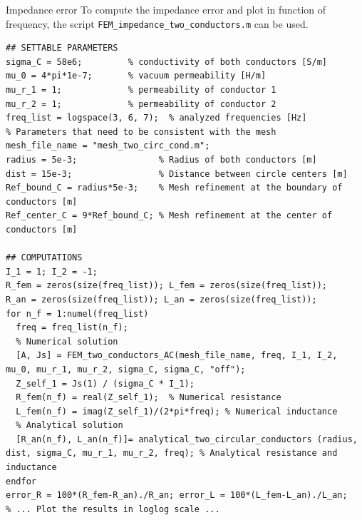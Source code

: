 \documentclass[aspectratio=54,xcolor=dvipsnames]{beamer}
\begin{document}
\begin{frame}[fragile]{Impedance error}
\scriptsize
To compute the impedance error and plot in function of frequency, the script \texttt{FEM\_impedance\_two\_conductors.m} can be used. 
\begin{lstlisting}[firstnumber=1]
## SETTABLE PARAMETERS
sigma_C = 58e6;         % conductivity of both conductors [S/m]
mu_0 = 4*pi*1e-7;       % vacuum permeability [H/m]
mu_r_1 = 1;             % permeability of conductor 1
mu_r_2 = 1;             % permeability of conductor 2
freq_list = logspace(3, 6, 7);  % analyzed frequencies [Hz]
% Parameters that need to be consistent with the mesh 
mesh_file_name = "mesh_two_circ_cond.m";
radius = 5e-3;                % Radius of both conductors [m]
dist = 15e-3;                 % Distance between circle centers [m]
Ref_bound_C = radius*5e-3;    % Mesh refinement at the boundary of conductors [m]
Ref_center_C = 9*Ref_bound_C; % Mesh refinement at the center of conductors [m]

## COMPUTATIONS
I_1 = 1; I_2 = -1;
R_fem = zeros(size(freq_list)); L_fem = zeros(size(freq_list));
R_an = zeros(size(freq_list)); L_an = zeros(size(freq_list));
for n_f = 1:numel(freq_list)
  freq = freq_list(n_f);
  % Numerical solution
  [A, Js] = FEM_two_conductors_AC(mesh_file_name, freq, I_1, I_2, mu_0, mu_r_1, mu_r_2, sigma_C, sigma_C, "off");
  Z_self_1 = Js(1) / (sigma_C * I_1);
  R_fem(n_f) = real(Z_self_1);  % Numerical resistance
  L_fem(n_f) = imag(Z_self_1)/(2*pi*freq); % Numerical inductance
  % Analytical solution
  [R_an(n_f), L_an(n_f)]= analytical_two_circular_conductors (radius, dist, sigma_C, mu_r_1, mu_r_2, freq); % Analytical resistance and inductance
endfor
error_R = 100*(R_fem-R_an)./R_an; error_L = 100*(L_fem-L_an)./L_an;
% ... Plot the results in loglog scale ...
\end{lstlisting}
\end{frame}
\end{document}
